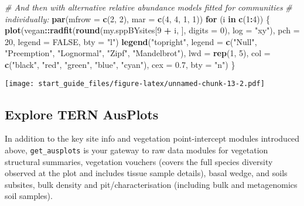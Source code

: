 \documentclass[
]{article}
\newenvironment{Shaded}{\begin{snugshade}}{\end{snugshade}}
\newcommand{\CommentTok}[1]{\textcolor[rgb]{0.56,0.35,0.01}{\textit{#1}}}
\newcommand{\ControlFlowTok}[1]{\textcolor[rgb]{0.13,0.29,0.53}{\textbf{#1}}}
\newcommand{\DataTypeTok}[1]{\textcolor[rgb]{0.13,0.29,0.53}{#1}}
\newcommand{\DecValTok}[1]{\textcolor[rgb]{0.00,0.00,0.81}{#1}}
\newcommand{\FloatTok}[1]{\textcolor[rgb]{0.00,0.00,0.81}{#1}}
\newcommand{\KeywordTok}[1]{\textcolor[rgb]{0.13,0.29,0.53}{\textbf{#1}}}
\newcommand{\NormalTok}[1]{#1}
\newcommand{\OperatorTok}[1]{\textcolor[rgb]{0.81,0.36,0.00}{\textbf{#1}}}
\newcommand{\OtherTok}[1]{\textcolor[rgb]{0.56,0.35,0.01}{#1}}
\newcommand{\StringTok}[1]{\textcolor[rgb]{0.31,0.60,0.02}{#1}}
\begin{document}
\begin{Shaded}
\begin{Highlighting}[]

\CommentTok{# And then with alternative relative abundance models fitted for communities}
\CommentTok{# individually:}
\KeywordTok{par}\NormalTok{(}\DataTypeTok{mfrow =} \KeywordTok{c}\NormalTok{(}\DecValTok{2}\NormalTok{, }\DecValTok{2}\NormalTok{), }\DataTypeTok{mar =} \KeywordTok{c}\NormalTok{(}\DecValTok{4}\NormalTok{, }\DecValTok{4}\NormalTok{, }\DecValTok{1}\NormalTok{, }\DecValTok{1}\NormalTok{))}
\ControlFlowTok{for}\NormalTok{ (i }\ControlFlowTok{in} \KeywordTok{c}\NormalTok{(}\DecValTok{1}\OperatorTok{:}\DecValTok{4}\NormalTok{)) \{}
    \KeywordTok{plot}\NormalTok{(vegan}\OperatorTok{::}\KeywordTok{radfit}\NormalTok{(}\KeywordTok{round}\NormalTok{(my.sppBYsites[}\DecValTok{9} \OperatorTok{+}\StringTok{ }\NormalTok{i, ], }\DataTypeTok{digits =} \DecValTok{0}\NormalTok{), }\DataTypeTok{log =} \StringTok{"xy"}\NormalTok{), }\DataTypeTok{pch =} \DecValTok{20}\NormalTok{, }
        \DataTypeTok{legend =} \OtherTok{FALSE}\NormalTok{, }\DataTypeTok{bty =} \StringTok{"l"}\NormalTok{)}
    \KeywordTok{legend}\NormalTok{(}\StringTok{"topright"}\NormalTok{, }\DataTypeTok{legend =} \KeywordTok{c}\NormalTok{(}\StringTok{"Null"}\NormalTok{, }\StringTok{"Preemption"}\NormalTok{, }\StringTok{"Lognormal"}\NormalTok{, }\StringTok{"Zipf"}\NormalTok{, }\StringTok{"Mandelbrot"}\NormalTok{), }
        \DataTypeTok{lwd =} \KeywordTok{rep}\NormalTok{(}\DecValTok{1}\NormalTok{, }\DecValTok{5}\NormalTok{), }\DataTypeTok{col =} \KeywordTok{c}\NormalTok{(}\StringTok{"black"}\NormalTok{, }\StringTok{"red"}\NormalTok{, }\StringTok{"green"}\NormalTok{, }\StringTok{"blue"}\NormalTok{, }\StringTok{"cyan"}\NormalTok{), }\DataTypeTok{cex =} \FloatTok{0.7}\NormalTok{, }
        \DataTypeTok{bty =} \StringTok{"n"}\NormalTok{)}
\NormalTok{\}}
\end{Highlighting}
\end{Shaded}

\texttt{[image: start\_guide\_files/figure-latex/unnamed-chunk-13-2.pdf]}

\hypertarget{explore-tern-ausplots}{%
\subsection{Explore TERN AusPlots}\label{explore-tern-ausplots}}

In addition to the key site info and vegetation point-intercept modules
introduced above, \texttt{get\_ausplots} is your gateway to raw data
modules for vegetation structural summaries, vegetation vouchers (covers
the full species diversity observed at the plot and includes tissue
sample details), basal wedge, and soils subsites, bulk density and
pit/characterisation (including bulk and metagenomics soil samples).
\end{document}
